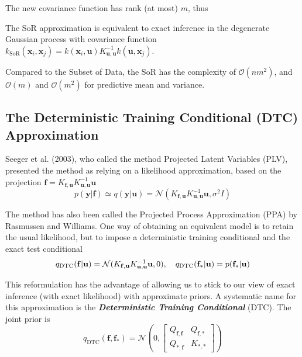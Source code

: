 \documentclass[10pt]{elegantbook}
\newcommand{\mydefination}[1]{\textbf{\textit{\textcolor{structurecolor}{#1}}}}
\begin{document}
The new covariance function has rank (at most) $m$, thus

\begin{remark}
    The SoR approximation is equivalent to exact inference in the degenerate Gaussian
process with covariance function $k_{\text{SoR}}(\mathbf x_i, \mathbf x_j) = k(\mathbf x_i, \mathbf u) K_{\mathbf{u,u}}^{-1} k(\mathbf u, \mathbf x_j)$.
\end{remark}

Compared to the Subset of Data, the SoR has the complexity of $\mathcal O(nm^2)$, and $\mathcal O(m)$ and $\mathcal O(m^2)$ for predictive mean and variance.

\subsection{The Deterministic Training Conditional (DTC) Approximation}
Seeger et al. (2003), who called the method Projected
Latent Variables (PLV), presented the method as relying on a likelihood approximation, based on
the projection $\mathbf f = K_{\mathbf f, \mathbf u} K_{\mathbf u, \mathbf u}^{-1} \mathbf u$
\begin{equation}
    p(\mathbf y | \mathbf f) \simeq q(\mathbf y | \mathbf u) = \mathcal N \left ( 
        K_{\mathbf f, \mathbf u} K_{\mathbf u, \mathbf u}^{-1} \mathbf u, \sigma^2 I
         \right )
\end{equation}

The method has also been called the Projected Process Approximation (PPA) by Rasmussen and
Williams. One way of obtaining an equivalent model is to retain the usual likelihood, but to impose a 
deterministic training conditional and the exact test conditional
\begin{equation}
    q_{\mathrm{DTC}}(\mathbf{f|u})=\mathcal{N}(K_{\mathbf{f,u}}K_{\mathbf{u,u}}^{-1}{\bf u},0),
    \quad q_{\mathrm{DTC}}(\mathbf{f_{*}}|{\bf u})=p(\mathbf{f_{*}}|{\bf u})
\end{equation}

This reformulation has the advantage of allowing us to stick to our view of exact inference (with
exact likelihood) with approximate priors. A systematic name for this
approximation is the \mydefination{Deterministic Training Conditional} (DTC). The joint prior is
\begin{equation}
    q_{\text{DTC}}(\mathbf f, \mathbf f_*) = \mathcal N \left ( 0, \begin{bmatrix}
        Q_{\mathbf f, \mathbf f} & Q_{\mathbf f, *} \\
        Q_{*, \mathbf f} & K_{*, *}
    \end{bmatrix} \right )
\end{equation}
\end{document}
